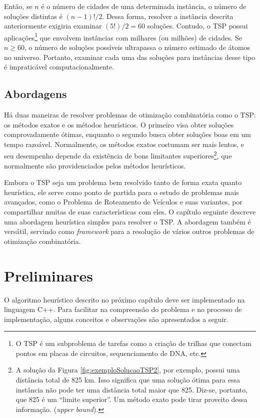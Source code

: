 Então, se \(n\) é o número de cidades de uma determinada instância, o número de soluções distintas é \((n-1)!/2\). Dessa forma, resolver a instância descrita anteriormente exigiria examinar \((5!)/2 = 60\) soluções. Contudo, o TSP possui aplicações\footnote{O TSP é um subproblema de tarefas como a criação de trilhas que conectam pontos em placas de circuitos, sequenciamento de DNA, etc.} que envolvem instâncias com milhares (ou milhões) de cidades. Se \(n \geq 60\), o número de soluções possíveis ultrapassa o número estimado de átomos no universo. Portanto, examinar cada uma das soluções para instâncias desse tipo é impraticável computacionalmente.

\subsection{Abordagens}
Há duas maneiras de resolver problemas de otimização combinatória como o TSP: os métodos exatos e os métodos heurísticos. O primeiro visa obter soluções comprovadamente ótimas, enquanto o segundo busca obter soluções boas em um tempo razoável. Normalmente, os métodos exatos costumam ser mais lentos, e seu desempenho depende da existência de bons limitantes superiores\footnote{A solução da Figura \ref{fig:exemploSolucaoTSP2}, por exemplo, possui uma distância total de 825 km. Isso significa que uma solução ótima para essa instância não pode ter uma distância total maior que 825. Diz-se, portanto, que 825 é um ``limite superior''. Um método exato pode tirar proveito dessa informação. (\textit{upper bound}).}, que normalmente são providenciados pelos métodos heurísticos.

Embora o TSP seja um problema bem resolvido tanto de forma exata quanto heurística, ele serve como ponto de partida para o estudo de problemas mais avançados, como o Problema de Roteamento de Veículos e suas variantes, por compartilhar muitas de suas características com eles. O capítulo seguinte descreve uma abordagem heurística simples para resolver o TSP. A abordagem também é versátil, servindo como \textit{framework} para a resolução de vários outros problemas de otimização combinatória.

\section{Preliminares}
O algoritmo heurístico descrito no próximo capítulo deve ser implementado na linguagem C++. Para facilitar na compreensão do problema e no processo de implementação, alguns conceitos e observações são apresentados a seguir.  

